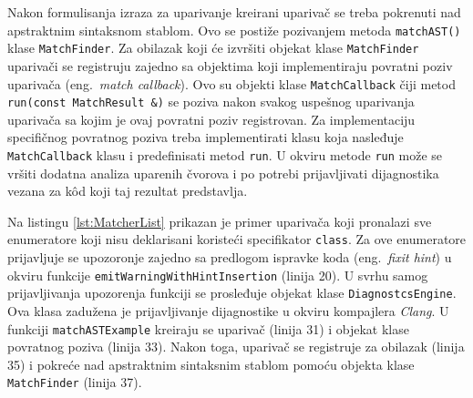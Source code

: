 \documentclass[12pt,oneside]{memoir}
\begin{document}
\par
Nakon formulisanja izraza za uparivanje kreirani upariva\v{c} se treba pokrenuti nad apstraktnim sintaksnom stablom. Ovo se posti\v{z}e pozivanjem metoda \texttt{matchAST()} klase \texttt{MatchFinder}. 
Za obilazak koji \'{c}e izvr\v{s}iti objekat klase \texttt{MatchFinder} upariva\v{c}i se registruju zajedno sa objektima koji implementiraju povratni poziv upariva\v{c}a (eng.~\textit{match callback}). 
Ovo su objekti klase \texttt{MatchCallback} \v{c}iji metod \texttt{run(const MatchResult \&)} se poziva nakon svakog uspe\v{s}nog uparivanja 
upariva\v{c}a sa kojim je ovaj povratni poziv registrovan. Za implementaciju specifi\v{c}nog povratnog poziva treba implementirati klasu koja nasleđuje \texttt{MatchCallback} klasu i predefinisati metod \texttt{run}. U okviru metode \texttt{run} mo\v{z}e se vr\v{s}iti dodatna analiza uparenih \v{c}vorova i po potrebi
prijavljivati dijagnostika vezana za k\^{o}d koji taj rezultat predstavlja. \par
Na listingu \ref{lst:MatcherList} prikazan je primer upariva\v{c}a koji pronalazi sve enumeratore koji nisu deklarisani koriste\'{c}i specifikator \texttt{class}. Za ove enumeratore prijavljuje se upozoronje zajedno sa predlogom ispravke koda (eng.~\textit{fixit hint}) u okviru funkcije \texttt{emitWarningWithHintInsertion} (linija 20). U svrhu samog
prijavljivanja upozorenja funkciji se prosleđuje objekat klase \texttt{DiagnostcsEngine}. Ova klasa zadu\v{z}ena je prijavljivanje dijagnostike u okviru kompajlera \textit{Clang}. U funkciji \texttt{matchASTExample} kreiraju se upariva\v{c} (linija 31) i objekat klase povratnog poziva (linija 33). Nakon toga, upariva\v{c} se registruje za obilazak (linija 35) i pokre\'{c}e nad apstraktnim sintaksnim stablom pomo\'{c}u objekta klase \texttt{MatchFinder} (linija 37).
\end{document}

